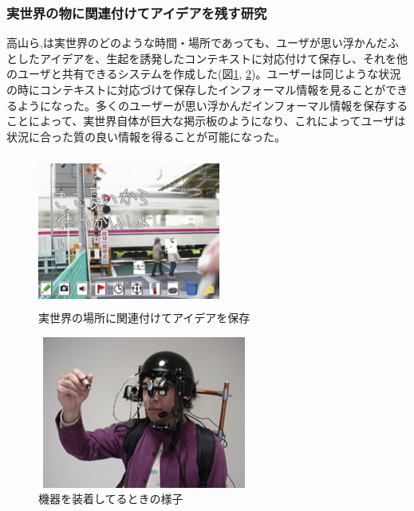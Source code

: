 \documentclass[11pt,a4j, titlepage]{jarticle} %
\begin{document}
\subsubsection{実世界の物に関連付けてアイデアを残す研究}
高山ら\cite{tano},\cite{tano2}は実世界のどのような時間・場所であっても、ユーザが思い浮かんだふとしたアイデアを、生起を誘発したコンテキストに対応付けて保存し、それを他のユーザと共有できるシステムを作成した(図\ref{fig:informal}, \ref{fig:informal2})。ユーザーは同じような状況の時にコンテキストに対応づけて保存したインフォーマル情報を見ることができるようになった。多くのユーザーが思い浮かんだインフォーマル情報を保存することによって、実世界自体が巨大な掲示板のようになり、これによってユーザは状況に合った質の良い情報を得ることが可能になった。

\begin{figure}[H]
  \begin{center}
    \includegraphics[clip,height=5.0cm,width=6.0cm]{./informal.eps}
    \caption{実世界の場所に関連付けてアイデアを保存}
    \label{fig:informal}
  \end{center}
\end{figure}

\begin{figure}[H]
  \begin{center}
    \includegraphics[clip,height=5.0cm,width=7.0cm]{./informal2.eps}
    \caption{機器を装着してるときの様子}
    \label{fig:informal2}
  \end{center}
\end{figure}
\end{document}
